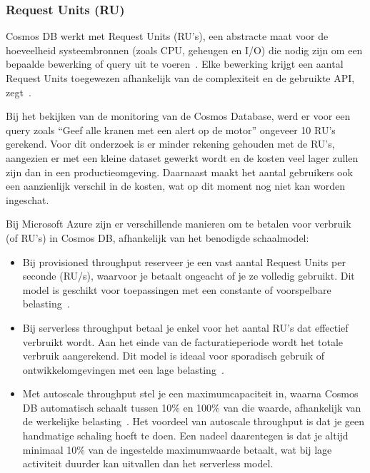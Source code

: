 \subsubsection{Request Units (RU)}
Cosmos DB werkt met Request Units (RU's), een abstracte maat voor de hoeveelheid systeembronnen (zoals CPU, geheugen en I/O) die nodig zijn om een bepaalde bewerking of query uit te voeren~\autocite{Brown2024}.
Elke bewerking krijgt een aantal Request Units toegewezen afhankelijk van de complexiteit en de gebruikte API, zegt~\textcite{Brown2024}.

Bij het bekijken van de monitoring van de Cosmos Database, werd er voor een query zoals ``Geef alle kranen met een alert op de motor'' ongeveer 10 RU's gerekend.
Voor dit onderzoek is er minder rekening gehouden met de RU's, aangezien er met een kleine dataset gewerkt wordt en de kosten veel lager zullen zijn dan in een productieomgeving.
Daarnaast maakt het aantal gebruikers ook een aanzienlijk verschil in de kosten, wat op dit moment nog niet kan worden ingeschat.

Bij Microsoft Azure zijn er verschillende manieren om te betalen voor verbruik (of RU’s) in Cosmos DB, afhankelijk van het benodigde schaalmodel:
\begin{itemize}
     \item Bij provisioned throughput reserveer je een vast aantal Request Units per seconde (RU/s), waarvoor je betaalt ongeacht of je ze volledig gebruikt. Dit model is geschikt voor toepassingen met een constante of voorspelbare belasting~\autocite{provisioned2024}.
     \item Bij serverless throughput betaal je enkel voor het aantal RU’s dat effectief verbruikt wordt. Aan het einde van de facturatieperiode wordt het totale verbruik aangerekend. Dit model is ideaal voor sporadisch gebruik of ontwikkelomgevingen met een lage belasting~\autocite{serverless2025}.
     \item Met autoscale throughput stel je een maximumcapaciteit in, waarna Cosmos DB automatisch schaalt tussen 10\% en 100\% van die waarde, afhankelijk van de werkelijke belasting~\autocite{autoscale2024}. Het voordeel van autoscale throughput is dat je geen handmatige schaling hoeft te doen. Een nadeel daarentegen is dat je altijd minimaal 10\% van de ingestelde maximumwaarde betaalt, wat bij lage activiteit duurder kan uitvallen dan het serverless model.
 \end{itemize}


